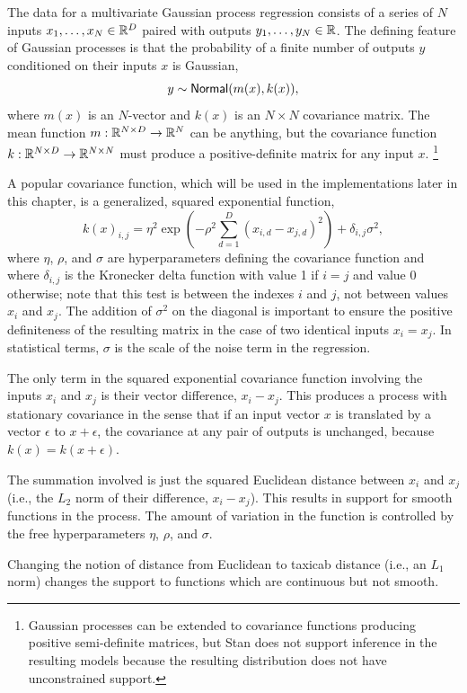 The data for a multivariate Gaussian process regression consists of a
series of $N$ inputs $x_1,\ldots,x_N \in \reals^D$ paired with outputs
$y_1,\ldots,y_N \in \reals$.  The defining feature of Gaussian
processes is that the probability of a finite number of outputs $y$
conditioned on their inputs $x$ is Gaussian,
\[
y \sim \distro{Normal}(m(x), k(x)),
\] 
where $m(x)$ is an $N$-vector and $k(x)$ is an $N \times N$
covariance matrix.  The mean function $m : \reals^{N \times D}
\rightarrow \reals^{N}$ can be anything, but the covariance function
$k : \reals^{N \times D} \rightarrow \reals^{N \times N}$ must produce
a positive-definite matrix for any input $x$.%
%
\footnote{Gaussian processes can be extended to covariance functions
  producing positive semi-definite matrices, but Stan does not support
  inference in the resulting models because the resulting distribution
  does not have unconstrained support.}

A popular covariance function, which will be used in the
implementations later in this chapter, is a generalized, squared
exponential function,
\[
k(x)_{i, j}
= \eta^2 
\exp \left(
- \rho^2 \sum_{d=1}^D (x_{i,d} - x_{j,d})^2
\right)
+ \delta_{i, j} \sigma^2,
\]
where $\eta$, $\rho$, and $\sigma$ are hyperparameters defining the
covariance function and where $\delta_{i, j}$ is the Kronecker delta
function with value 1 if $i = j$ and value 0 otherwise; note that this
test is between the indexes $i$ and $j$, not between values $x_i$ and
$x_j$. The addition of $\sigma^2$ on the diagonal is important
to ensure the positive definiteness of the resulting matrix in the case of
two identical inputs $x_i = x_j$.  In statistical terms, $\sigma$ is
the scale of the noise term in the regression.

The only term in the squared exponential covariance function involving
the inputs $x_i$ and $x_j$ is their vector difference, $x_i - x_j$.
This produces a process with stationary covariance in the sense that
if an input vector $x$ is translated by a vector $\epsilon$ to $x +
\epsilon$, the covariance at any pair of outputs is unchanged, because
$k(x) = k(x+\epsilon)$.

The summation involved is just the squared Euclidean distance between
$x_i$ and $x_j$ (i.e., the $L_2$ norm of their difference, $x_i -
x_j$). This results in support for smooth functions in the process.
The amount of variation in the function is controlled by the free
hyperparameters $\eta$, $\rho$, and $\sigma$.  

Changing the notion of distance from Euclidean to taxicab distance
(i.e., an $L_1$ norm) changes the support to functions which are
continuous but not smooth.



